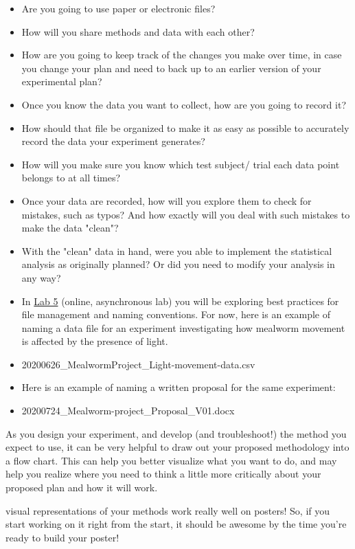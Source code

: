 \documentclass[
]{book}
\providecommand{\tightlist}{%
  \setlength{\itemsep}{0pt}\setlength{\parskip}{0pt}}
\begin{document}
\begin{itemize}
\tightlist
\item
  Are you going to use paper or electronic files?
\item
  How will you share methods and data with each other?
\item
  How are you going to keep track of the changes you make over time, in case you change your plan and need to back up to an earlier version of your experimental plan?
\item
  Once you know the data you want to collect, how are you going to record it?
\item
  How should that file be organized to make it as easy as possible to accurately record the data your experiment generates?
\item
  How will you make sure you know which test subject/ trial each data point belongs to at all times?
\item
  Once your data are recorded, how will you explore them to check for mistakes, such as typos? And how exactly will you deal with such mistakes to make the data "clean"?
\item
  With the "clean" data in hand, were you able to implement the statistical analysis as originally planned? Or did you need to modify your analysis in any way?
\item
  In \href{https://ubco-biology.github.io/BIOL-116-Lab-Manual/naming-conventions.html}{Lab 5} (online, asynchronous lab) you will be exploring best practices for file management and naming conventions. For now, here is an example of naming a data file for an experiment investigating how mealworm movement is affected by the presence of light.
\item
  20200626\_MealwormProject\_Light-movement-data.csv
\item
  Here is an example of naming a written proposal for the same experiment:
\item
  20200724\_Mealworm-project\_Proposal\_V01.docx
\end{itemize}

As you design your experiment, and develop (and troubleshoot!) the method you expect to use, it can be very helpful to draw out your proposed methodology into a flow chart. This can help you better visualize what you want to do, and may help you realize where you need to think a little more critically about your proposed plan and how it will work.

visual representations of your methods work really well on posters! So, if you start working on it right from the start, it should be awesome by the time you're ready to build your poster!
\end{document}
